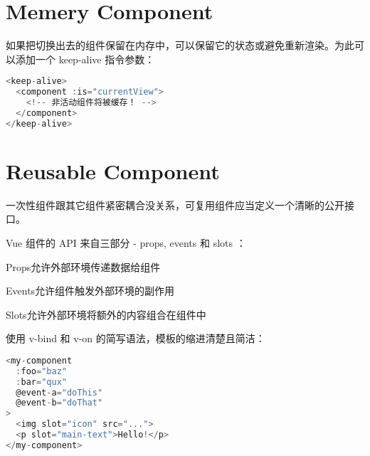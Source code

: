 \begin{lstlisting}[language=JavaScript]

\end{lstlisting}




\begin{lstlisting}[language=JavaScript]

\end{lstlisting}



\begin{lstlisting}[language=JavaScript]

\end{lstlisting}




\section{Memery Component}


如果把切换出去的组件保留在内存中，可以保留它的状态或避免重新渲染。为此可以添加一个 keep-alive 指令参数：

\begin{lstlisting}[language=JavaScript]
<keep-alive>
  <component :is="currentView">
    <!-- 非活动组件将被缓存！ -->
  </component>
</keep-alive>
\end{lstlisting}


\section{Reusable Component}

一次性组件跟其它组件紧密耦合没关系，可复用组件应当定义一个清晰的公开接口。

Vue 组件的 API 来自三部分 - props, events 和 slots ：

\begin{compactitem}
\item Props允许外部环境传递数据给组件
\item Events允许组件触发外部环境的副作用
\item Slots允许外部环境将额外的内容组合在组件中
\end{compactitem}

使用 v-bind 和 v-on 的简写语法，模板的缩进清楚且简洁：


\begin{lstlisting}[language=JavaScript]
<my-component
  :foo="baz"
  :bar="qux"
  @event-a="doThis"
  @event-b="doThat"
>
  <img slot="icon" src="...">
  <p slot="main-text">Hello!</p>
</my-component>
\end{lstlisting}


